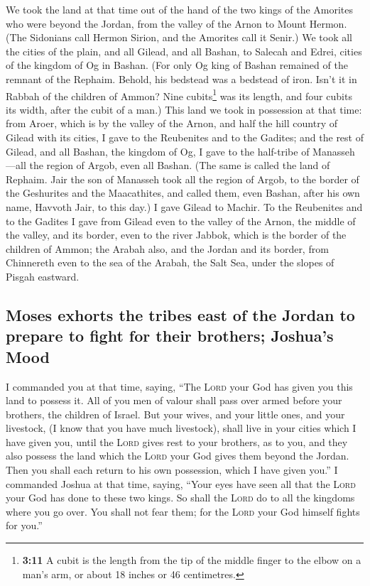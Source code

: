 We took the land at that time out of the hand of the two
kings of the Amorites who were beyond the Jordan, from the valley of the
Arnon to Mount Hermon.  (The Sidonians call Hermon Sirion,
and the Amorites call it Senir.)  We took all the cities
of the plain, and all Gilead, and all Bashan, to Salecah and Edrei,
cities of the kingdom of Og in Bashan.  (For only Og king
of Bashan remained of the remnant of the Rephaim. Behold, his bedstead
was a bedstead of iron. Isn't it in Rabbah of the children of Ammon?
Nine cubits\footnote{\textbf{3:11} A cubit is the length from the tip of
  the middle finger to the elbow on a man's arm, or about 18 inches or
  46 centimetres.} was its length, and four cubits its width, after the
cubit of a man.)  This land we took in possession at that
time: from Aroer, which is by the valley of the Arnon, and half the hill
country of Gilead with its cities, I gave to the Reubenites and to the
Gadites;  and the rest of Gilead, and all Bashan, the
kingdom of Og, I gave to the half-tribe of Manasseh---all the region of
Argob, even all Bashan. (The same is called the land of Rephaim.
 Jair the son of Manasseh took all the region of Argob,
to the border of the Geshurites and the Maacathites, and called them,
even Bashan, after his own name, Havvoth Jair, to this day.)
 I gave Gilead to Machir.  To the
Reubenites and to the Gadites I gave from Gilead even to the valley of
the Arnon, the middle of the valley, and its border, even to the river
Jabbok, which is the border of the children of Ammon; 
the Arabah also, and the Jordan and its border, from Chinnereth even to
the sea of the Arabah, the Salt Sea, under the slopes of Pisgah
eastward.

\hypertarget{moses-exhorts-the-tribes-east-of-the-jordan-to-prepare-to-fight-for-their-brothers-joshuas-mood}{%
\subsection{Moses exhorts the tribes east of the Jordan to prepare to
fight for their brothers; Joshua's
Mood}\label{moses-exhorts-the-tribes-east-of-the-jordan-to-prepare-to-fight-for-their-brothers-joshuas-mood}}

 I commanded you at that time, saying, ``The
\textsc{Lord} your God has given you this land to possess it. All of you
men of valour shall pass over armed before your brothers, the children
of Israel.  But your wives, and your little ones, and
your livestock, (I know that you have much livestock), shall live in
your cities which I have given you,  until the
\textsc{Lord} gives rest to your brothers, as to you, and they also
possess the land which the \textsc{Lord} your God gives them beyond the
Jordan. Then you shall each return to his own possession, which I have
given you.''  I commanded Joshua at that time, saying,
``Your eyes have seen all that the \textsc{Lord} your God has done to
these two kings. So shall the \textsc{Lord} do to all the kingdoms where
you go over.  You shall not fear them; for the
\textsc{Lord} your God himself fights for you.''

